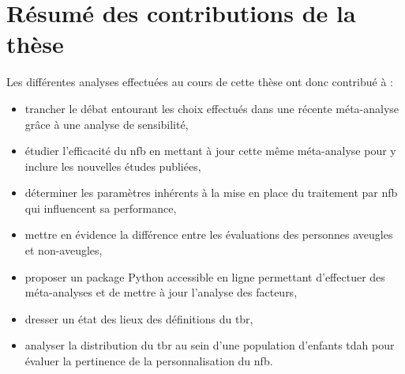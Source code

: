 \section{Résumé des contributions de la thèse}

Les différentes analyses effectuées au cours de cette thèse ont donc contribué à :
\begin{itemize}
\item trancher le débat entourant les choix effectués dans une récente méta-analyse grâce à une analyse de sensibilité,
\item étudier l'efficacité du \gls{nfb} en mettant à jour cette même méta-analyse pour y inclure les nouvelles études publiées,
\item déterminer les paramètres inhérents à la mise en place du traitement par \gls{nfb} qui influencent sa performance,
\item mettre en évidence la différence entre les évaluations des personnes aveugles et non-aveugles,
\item proposer un package Python accessible en ligne permettant d'effectuer des méta-analyses et de mettre à jour l'analyse des facteurs,
\item dresser un état des lieux des définitions du \gls{tbr},
\item analyser la distribution du \gls{tbr} au sein d'une population d'enfants \gls{tdah} pour évaluer la pertinence 
de la personnalisation du \gls{nfb}.
\end{itemize}


%

